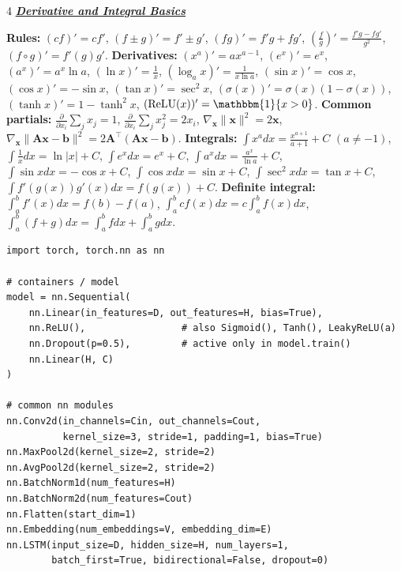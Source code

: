 \documentclass[10pt]{article}
\newcommand{\bulletPoint}[1]{\ul{\textit{\textbf{#1}}}}
\begin{document}
\begin{multicols*}{4}
\bulletPoint{Derivative and Integral Basics} \quad

\textbf{Rules:}
$(cf)'=cf'$, $(f\pm g)'=f'\pm g'$,
$(fg)'=f'g+fg'$,
$\left(\frac{f}{g}\right)'=\frac{f'g-fg'}{g^2}$,
$(f\circ g)'=f'(g)g'$. \quad
\textbf{Derivatives:}
$(x^a)'=ax^{a-1}$,
$(e^x)'=e^x$,
$(a^x)'=a^x\ln a$,
$(\ln x)'=\frac{1}{x}$,
$(\log_a x)'=\frac{1}{x\ln a}$,
$(\sin x)'=\cos x$,
$(\cos x)'=-\sin x$,
$(\tan x)'=\sec^2 x$,
$(\sigma(x))'=\sigma(x)(1-\sigma(x))$,
$(\tanh x)'=1-\tanh^2x$,
$(\mathrm{ReLU}(x))'=\mathbbm{1}\{x>0\}$. \quad
\textbf{Common partials:}
$\frac{\partial}{\partial x_i}\sum_j x_j=1$,
$\frac{\partial}{\partial x_i}\sum_j x_j^2=2x_i$,
$\nabla_{\mathbf{x}}\|\mathbf{x}\|^2=2\mathbf{x}$,
$\nabla_{\mathbf{x}}\|\mathbf{A}\mathbf{x}-\mathbf{b}\|^2
=2\mathbf{A}^\top(\mathbf{A}\mathbf{x}-\mathbf{b})$. \quad
\textbf{Integrals:}
$\int x^a dx=\frac{x^{a+1}}{a+1}+C$ $(a\ne-1)$,
$\int \frac{1}{x}dx=\ln|x|+C$,
$\int e^x dx=e^x+C$,
$\int a^x dx=\frac{a^x}{\ln a}+C$,
$\int \sin x dx=-\cos x+C$,
$\int \cos x dx=\sin x+C$,
$\int \sec^2x dx=\tan x+C$,
$\int f'(g(x))g'(x)dx=f(g(x))+C$. \quad
\textbf{Definite integral:}
$\int_a^b f'(x)dx=f(b)-f(a)$,
$\int_a^b cf(x)dx=c\int_a^b f(x)dx$,
$\int_a^b(f+g)dx=\int_a^b fdx+\int_a^b gdx$.




\begin{lstlisting}
import torch, torch.nn as nn

# containers / model
model = nn.Sequential(
    nn.Linear(in_features=D, out_features=H, bias=True),
    nn.ReLU(),                 # also Sigmoid(), Tanh(), LeakyReLU(a)
    nn.Dropout(p=0.5),         # active only in model.train()
    nn.Linear(H, C)
)

# common nn modules
nn.Conv2d(in_channels=Cin, out_channels=Cout,
          kernel_size=3, stride=1, padding=1, bias=True)
nn.MaxPool2d(kernel_size=2, stride=2)
nn.AvgPool2d(kernel_size=2, stride=2)
nn.BatchNorm1d(num_features=H)
nn.BatchNorm2d(num_features=Cout)
nn.Flatten(start_dim=1)
nn.Embedding(num_embeddings=V, embedding_dim=E)
nn.LSTM(input_size=D, hidden_size=H, num_layers=1,
        batch_first=True, bidirectional=False, dropout=0)


\end{lstlisting}
\end{multicols*}
\end{document}

